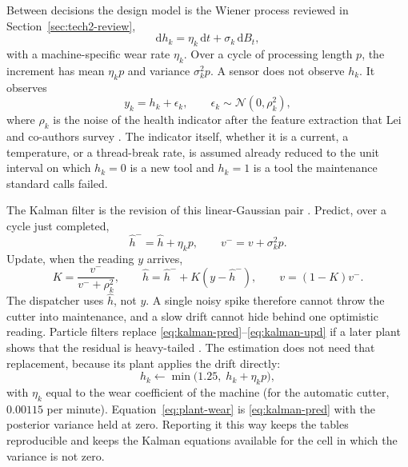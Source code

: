 Between decisions the design model is the Wiener process reviewed in Section~\ref{sec:tech2-review},
\begin{equation}
\mathrm{d}h_k = \eta_k \, \mathrm{d}t + \sigma_k \, \mathrm{d}B_t ,
\label{eq:sde}
\end{equation}
with a machine-specific wear rate \(\eta_k\). Over a cycle of processing length \(p\), the increment has mean \(\eta_k p\) and variance \(\sigma_k^2 p\). A sensor does not observe \(h_k\). It observes
\begin{equation}
y_k = h_k + \epsilon_k , \qquad \epsilon_k \sim \mathcal{N}(0, \rho_k^2) ,
\label{eq:sensor}
\end{equation}
where \(\rho_k\) is the noise of the health indicator after the feature extraction that Lei and co-authors survey \cite{lei2018}. The indicator itself, whether it is a current, a temperature, or a thread-break rate, is assumed already reduced to the unit interval on which \(h_k = 0\) is a new tool and \(h_k = 1\) is a tool the maintenance standard calls failed.

The Kalman filter is the revision of this linear-Gaussian pair \cite{kalman1960}. Predict, over a cycle just completed,
\begin{equation}
\hat h^- = \hat h + \eta_k p , \qquad v^- = v + \sigma_k^2 p .
\label{eq:kalman-pred}
\end{equation}
Update, when the reading \(y\) arrives,
\begin{equation}
K = \frac{v^-}{v^- + \rho_k^2} , \qquad \hat h = \hat h^- + K(y - \hat h^-) , \qquad v = (1-K)v^- .
\label{eq:kalman-upd}
\end{equation}
The dispatcher uses \(\hat h\), not \(y\). A single noisy spike therefore cannot throw the cutter into maintenance, and a slow drift cannot hide behind one optimistic reading. Particle filters replace \eqref{eq:kalman-pred}--\eqref{eq:kalman-upd} if a later plant shows that the residual is heavy-tailed \cite{arulampalam2002}. The estimation does not need that replacement, because its plant applies the drift directly:
\begin{equation}
h_k \leftarrow \min\big(1.25,\; h_k + \eta_k p \big) ,
\label{eq:plant-wear}
\end{equation}
with \(\eta_k\) equal to the wear coefficient of the machine (for the automatic cutter, \(0.00115\) per minute). Equation~\eqref{eq:plant-wear} is \eqref{eq:kalman-pred} with the posterior variance held at zero. Reporting it this way keeps the tables reproducible and keeps the Kalman equations available for the cell in which the variance is not zero.

